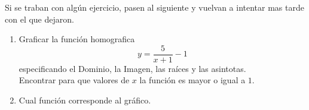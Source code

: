 \documentclass[a4paper,spanish]{exam}
\begin{document}
Si se traban con algún ejercicio, pasen al siguiente y vuelvan a intentar mas tarde con el que dejaron.

\begin{enumerate}



\item Graficar la función homografica \[ y=\frac{5}{x+1}-1 \] especificando el Dominio, la Imagen, las raíces y las asintotas. \\

Encontrar para que valores de $x$ la función es mayor o igual a $1$.


\item Cual función corresponde al gráfico. 


\end{enumerate}
\end{document}
